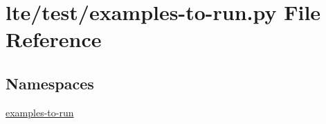 \hypertarget{lte_2test_2examples-to-run_8py}{}\section{lte/test/examples-\/to-\/run.py File Reference}
\label{lte_2test_2examples-to-run_8py}
\subsection*{Namespaces}
\begin{DoxyCompactItemize}
\item 
 \hyperlink{namespaceexamples-to-run}{examples-\/to-\/run}
\end{DoxyCompactItemize}

